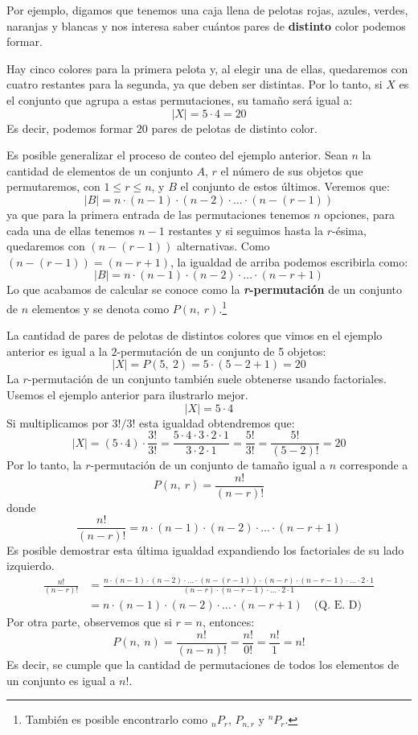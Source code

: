 \documentclass[12pt]{article}
\begin{document}
Por ejemplo, digamos que tenemos una caja llena de pelotas rojas, azules, verdes, naranjas y blancas y nos interesa saber cuántos pares de \textbf{distinto} color podemos formar.

Hay cinco colores para la primera pelota y, al elegir una de ellas, quedaremos con cuatro restantes para la segunda, ya que deben ser distintas. Por lo tanto, si $X$ es el conjunto que agrupa a estas permutaciones, su tamaño será igual a:
\[
  |X| = 5 \cdot 4 = 20
\]
Es decir, podemos formar $20$ pares de pelotas de distinto color.

Es posible generalizar el proceso de conteo del ejemplo anterior. Sean $n$ la cantidad de elementos de un conjunto $A$, $r$ el número de sus objetos que permutaremos, con $1 \leq r \leq n$, y $B$ el conjunto de estos últimos. Veremos que:
\[
  |B| = n \cdot (n - 1) \cdot (n - 2) \cdot \ldots \cdot (n - (r - 1))
\]
ya que para la primera entrada de las permutaciones tenemos $n$ opciones, para cada una de ellas tenemos $n - 1$ restantes y si seguimos hasta la $r$-ésima, quedaremos con $(n - (r - 1))$ alternativas. Como $(n - (r - 1)) = (n - r + 1)$, la igualdad de arriba podemos escribirla como:
\[
  |B| = n \cdot (n - 1) \cdot (n - 2) \cdot \ldots \cdot (n - r + 1)
\]
Lo que acabamos de calcular se conoce como la \textbf{\textit{r}-permutación} de un conjunto de $n$ elementos y se denota como $P(n, \ r)$.\footnote{También es posible encontrarlo como ${}_{n}P_{r}$, $P_{n, r}$ y ${}^{n}P_{r}$.}

La cantidad de pares de pelotas de distintos colores que vimos en el ejemplo anterior es igual a la $2$-permutación de un conjunto de 5 objetos:
\[
  |X| = P(5, \ 2) = 5 \cdot (5 - 2 + 1) = 20
\]
La $r$-permutación de un conjunto también suele obtenerse usando factoriales. Usemos el ejemplo anterior para ilustrarlo mejor.
\[
  |X| = 5 \cdot 4
\]
Si multiplicamos por $3!/3!$ esta igualdad obtendremos que:
\[
  |X| = (5 \cdot 4) \cdot \frac{3!}{3!}
      = \frac{5 \cdot 4 \cdot 3 \cdot 2 \cdot 1}{3 \cdot 2 \cdot 1}
      = \frac{5!}{3!}
      = \frac{5!}{(5 - 2)!}
      = 20
\]
Por lo tanto, la $r$-permutación de un conjunto de tamaño igual a $n$ corresponde a
\[
  P(n, \ r) = \frac{n!}{(n - r)!}
\]
donde
\[
  \frac{n!}{(n - r)!} = n \cdot (n - 1) \cdot (n - 2) \cdot \ldots \cdot (n - r + 1)
\]
Es posible demostrar esta última igualdad expandiendo los factoriales de su lado izquierdo.
\begin{align*}
  \frac{n!}{(n - r)!} &= \frac{n \cdot (n - 1) \cdot (n - 2) \cdot \ldots \cdot (n - (r - 1)) \cdot (n - r) \cdot (n - r - 1) \cdot \ldots \cdot 2 \cdot 1}
                             {(n - r) \cdot (n - r - 1) \cdot \ldots \cdot 2 \cdot 1} \\
                      &= n \cdot (n - 1) \cdot (n - 2) \cdot \ldots \cdot (n - r + 1) \quad \text{(Q. E. D)}
\end{align*}
Por otra parte, observemos que si $r = n$, entonces:
\[
  P(n, \ n) = \frac{n!}{(n - n)!} = \frac{n!}{0!} = \frac{n!}{1} = n!
\]
Es decir, se cumple que la cantidad de permutaciones de todos los elementos de un conjunto es igual a $n!$.
\end{document}
